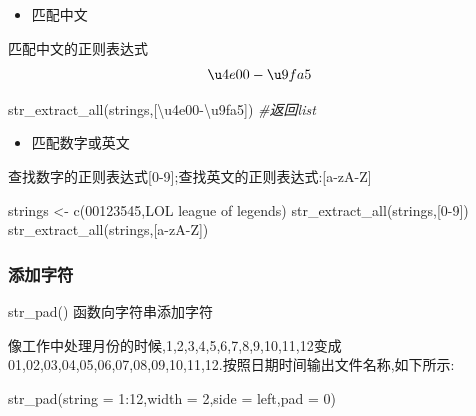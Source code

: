 \documentclass[
]{book}
\newenvironment{Shaded}{\begin{snugshade}}{\end{snugshade}}
\newcommand{\AttributeTok}[1]{\textcolor[rgb]{0.77,0.63,0.00}{#1}}
\newcommand{\CommentTok}[1]{\textcolor[rgb]{0.56,0.35,0.01}{\textit{#1}}}
\newcommand{\DecValTok}[1]{\textcolor[rgb]{0.00,0.00,0.81}{#1}}
\newcommand{\FunctionTok}[1]{\textcolor[rgb]{0.00,0.00,0.00}{#1}}
\newcommand{\NormalTok}[1]{#1}
\newcommand{\OtherTok}[1]{\textcolor[rgb]{0.56,0.35,0.01}{#1}}
\newcommand{\SpecialCharTok}[1]{\textcolor[rgb]{0.00,0.00,0.00}{#1}}
\newcommand{\StringTok}[1]{\textcolor[rgb]{0.31,0.60,0.02}{#1}}
\providecommand{\tightlist}{%
  \setlength{\itemsep}{0pt}\setlength{\parskip}{0pt}}
\begin{document}
\begin{itemize}
\tightlist
\item
  匹配中文
\end{itemize}

匹配中文的正则表达式\[\u4e00-\u9fa5\]

\begin{Shaded}
\begin{Highlighting}[]
\FunctionTok{str\_extract\_all}\NormalTok{(strings,}\StringTok{\textquotesingle{}[\textbackslash{}u4e00{-}\textbackslash{}u9fa5]\textquotesingle{}}\NormalTok{) }\CommentTok{\#返回list}
\end{Highlighting}
\end{Shaded}

\begin{itemize}
\tightlist
\item
  匹配数字或英文
\end{itemize}

查找数字的正则表达式{[}0-9{]};查找英文的正则表达式:{[}a-zA-Z{]}

\begin{Shaded}
\begin{Highlighting}[]
\NormalTok{strings }\OtherTok{\textless{}{-}} \FunctionTok{c}\NormalTok{(}\StringTok{\textquotesingle{}00123545\textquotesingle{}}\NormalTok{,}\StringTok{\textquotesingle{}LOL league of legends\textquotesingle{}}\NormalTok{)}
\FunctionTok{str\_extract\_all}\NormalTok{(strings,}\StringTok{\textquotesingle{}[0{-}9]\textquotesingle{}}\NormalTok{)}
\FunctionTok{str\_extract\_all}\NormalTok{(strings,}\StringTok{\textquotesingle{}[a{-}zA{-}Z]\textquotesingle{}}\NormalTok{) }
\end{Highlighting}
\end{Shaded}

\hypertarget{ux6dfbux52a0ux5b57ux7b26}{%
\subsubsection{添加字符}\label{ux6dfbux52a0ux5b57ux7b26}}

str\_pad() 函数向字符串添加字符

像工作中处理月份的时候,1,2,3,4,5,6,7,8,9,10,11,12变成01,02,03,04,05,06,07,08,09,10,11,12.按照日期时间输出文件名称,如下所示:

\begin{Shaded}
\begin{Highlighting}[]
\FunctionTok{str\_pad}\NormalTok{(}\AttributeTok{string =} \DecValTok{1}\SpecialCharTok{:}\DecValTok{12}\NormalTok{,}\AttributeTok{width =} \DecValTok{2}\NormalTok{,}\AttributeTok{side =} \StringTok{\textquotesingle{}left\textquotesingle{}}\NormalTok{,}\AttributeTok{pad =} \StringTok{\textquotesingle{}0\textquotesingle{}}\NormalTok{)}
\end{Highlighting}
\end{Shaded}
\end{document}
